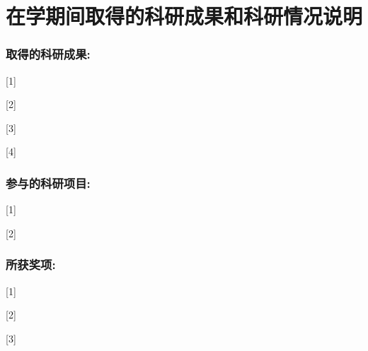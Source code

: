 
\chapter*{\texorpdfstring{在学期间取得的科研成果和科研情况说明}{在学期间取得的科研成果和科研情况说明}}



\subsection*{取得的科研成果:}

[1] 


[2] 


[3] 


[4]


\subsection*{参与的科研项目:}


[1] 


[2] 


\subsection*{所获奖项:}

[1] 


[2] 


[3] 